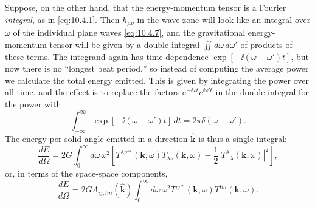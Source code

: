 Suppose, on the other hand, that the energy-momentum tensor is a Fourier
\emph{integral}, as in \eqref{eq:10.4.1}. Then \(h_{\mu\nu}\) in the wave
zone will look like an integral over \(\omega\) of the individual plane
waves \eqref{eq:10.4.7}, and the gravitational energy-momentum tensor will
be given by a double integral \(\iint d\omega\,d\omega'\) of products of
these terms. The integrand again has time dependence
\(\exp[-\ii(\omega-\omega')t]\), but now there is no ``longest beat
period,'' so instead of computing the average power we calculate the total
energy emitted. This is given by integrating the power over all time, and
the effect is to replace the factors \(e^{-\ii\omega t}e^{\ii\omega't}\) in
the double integral for the power with
\[
  \int_{-\infty}^{\infty}
  \exp[-\ii(\omega-\omega')t]\,dt
  =
  2\pi\delta(\omega-\omega').
\]
The energy per solid angle emitted in a direction
\(\widehat{\mathbf{k}}\) is thus a single integral:
\begin{equation}
  \frac{dE}{d\Omega}
  =
  2G\int_0^\infty d\omega\,\omega^2
  \left[
    T^{\lambda\nu*}(\mathbf{k},\omega)
    T_{\lambda\nu}(\mathbf{k},\omega)
    -\frac12\left|T^\lambda{}_\lambda(\mathbf{k},\omega)\right|^2
  \right],
  \tag{10.4.16}\label{eq:10.4.16}
\end{equation}
or, in terms of the space-space components,
\[
  \frac{dE}{d\Omega}
  =
  2G\Lambda_{ij,lm}(\widehat{\mathbf{k}})
  \int_0^\infty d\omega\,\omega^2
  T^{ij*}(\mathbf{k},\omega)T^{lm}(\mathbf{k},\omega).
\]

